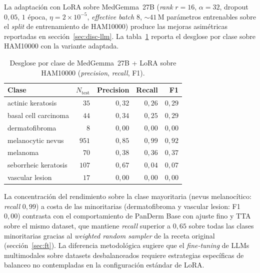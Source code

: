 La adaptación con LoRA sobre MedGemma~27B
(\emph{rank} $r = 16$, $\alpha = 32$, dropout $0{,}05$,
$1$ época, $\eta = 2\times 10^{-5}$, \emph{effective batch}
$8$, $\sim 41$\,M parámetros entrenables sobre el
\emph{split} de entrenamiento de HAM10000) produce las mejoras
asimétricas reportadas en secci\'on~\ref{sec:disc-llm}. La
tabla~\ref{tab:anexoh-medgemma-perclass} reporta el desglose por
clase sobre HAM10000 con la variante adaptada.

\begin{table}[H]
\centering
\footnotesize
\setlength{\tabcolsep}{4pt}
\renewcommand{\arraystretch}{0.95}
\caption{Desglose por clase de MedGemma~27B + LoRA sobre HAM10000
(\emph{precision}, \emph{recall}, F1).}
\label{tab:anexoh-medgemma-perclass}
\begin{tabular}{lrrrr}
\hline
Clase                       & $N_{\mathrm{test}}$ & Precision & Recall    & F1 \\
\hline
actinic keratosis           & $35$    & $0{,}32$  & $0{,}26$  & $0{,}29$ \\
basal cell carcinoma        & $44$    & $0{,}34$  & $0{,}25$  & $0{,}29$ \\
dermatofibroma              & $8$     & $0{,}00$  & $0{,}00$  & $0{,}00$ \\
melanocytic nevus           & $951$   & $0{,}85$  & $0{,}99$  & $0{,}92$ \\
melanoma                    & $70$    & $0{,}38$  & $0{,}36$  & $0{,}37$ \\
seborrheic keratosis        & $107$   & $0{,}67$  & $0{,}04$  & $0{,}07$ \\
vascular lesion             & $17$    & $0{,}00$  & $0{,}00$  & $0{,}00$ \\
\hline
\end{tabular}
\end{table}

La concentración del rendimiento sobre la clase mayoritaria
(nevus melanocítico: \emph{recall} $0{,}99$) a costa de las
minoritarias (dermatofibroma y vascular lesion: F1 $0{,}00$)
contrasta con el comportamiento de PanDerm Base con ajuste fino y TTA
sobre el mismo dataset, que mantiene \emph{recall} superior a
$0{,}65$ sobre todas las clases minoritarias gracias al
\emph{weighted random sampler} de la receta original
(secci\'on~\ref{sec:ft}). La diferencia metodológica sugiere que el
\emph{fine-tuning} de LLMs multimodales sobre datasets
desbalanceados requiere estrategias específicas de balanceo no
contempladas en la configuración estándar de LoRA.

